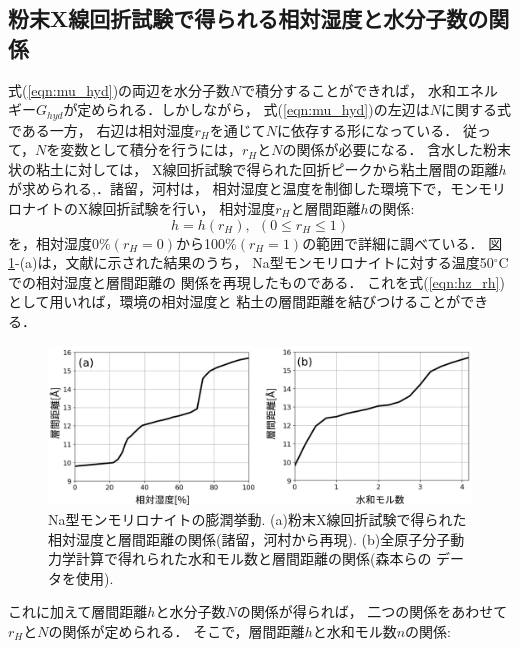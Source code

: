 \subsection{粉末X線回折試験で得られる相対湿度と水分子数の関係}
式(\ref{eqn:mu_hyd})の両辺を水分子数\(N\)で積分することができれば，
水和エネルギー\(G_{hyd}\)が定められる．しかしながら，
式(\ref{eqn:mu_hyd})の左辺は\(N\)に関する式である一方，
右辺は相対湿度\(r_H\)を通じて\(N\)に依存する形になっている．
従って，$N$を変数として積分を行うには，\(r_H\)と\(N\)の関係が必要になる．
含水した粉末状の粘土に対しては， X線回折試験で得られた回折ピークから粘土層間の距離\(h\)
が求められる\cite{Morodome},\cite{Yamada}．諸留，河村\cite{Morodome}は，
相対湿度と温度を制御した環境下で，モンモリロナイトのX線回折試験を行い，
相対湿度$r_H$と層間距離$h$の関係:
\begin{equation}
	h=h(r_H), \ \ (0 \leq r_H \leq 1)
	\label{eqn:hz_rh}
\end{equation}
を，相対湿度0$\% (r_H=0)$から100$\% (r_H=1)$の範囲で詳細に調べている．
図\ref{fig:fig1}-(a)は，文献\cite{Morodome}に示された結果のうち，
Na型モンモリロナイトに対する温度50\(^\circ\)Cでの相対湿度と層間距離の
関係を再現したものである．
これを式(\ref{eqn:hz_rh})として用いれば，環境の相対湿度と
粘土の層間距離を結びつけることができる．
\begin{figure}[h]
	\begin{center}
	\includegraphics[width=1.0\linewidth]{Figs/fig1.pdf} 
	\end{center}
	\caption{
		Na型モンモリロナイトの膨潤挙動.
		(a)粉末X線回折試験で得られた相対湿度と層間距離の関係(諸留，河村\cite{Morodome}から再現).
		(b)全原子分子動力学計算で得れられた水和モル数と層間距離の関係(森本ら\cite{Morimoto}の
		データを使用). 
	} 
	\label{fig:fig1}
\end{figure}
これに加えて層間距離\(h\)と水分子数\(N\)の関係が得られば，
二つの関係をあわせて\(r_H\)と\(N\)の関係が定められる．
そこで，層間距離$h$と水和モル数\(n\)の関係:
